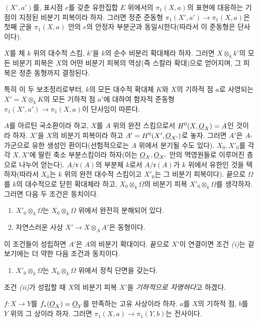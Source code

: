  $(X',a')$를, 표시점 $e$를 갖춘 유한집합 $E$
위에서의 $\pi_1(X,a)$의 표현에 대응하는 기점이 지정된 비분기 피복이라
하자. 그러면 정준 준동형
$\pi_1(X',a')\longrightarrow\pi_1(X,a)$은 첫째 군을 $\pi_1(X,a)$ 안의
$e$의 안정자 부분군과 동일시한다(따라서 이 준동형은 단사이다).

 $X$를 체 $k$ 위의 대수적 스킴, $k'$을 $k$의
순수 비분리 확대체라 하자. 그러면 $X\otimes_k k'$의 모든 비분기 피복은
$X$의 어떤 비분기 피복의 역상(즉 스칼라 확대)으로 얻어지며, 그 피복은
정준 동형까지 결정된다.

특히 이 두 보조정리로부터, $k$의 모든 대수적 확대체 $K$와
$X$의 기하적 점 $a$로 사영되는 $X'=X\otimes_k K$의 모든 기하적 점
$a'$에 대하여 함자적 준동형
$\pi_1(X',a')\longrightarrow\pi_1(X,a)$이 단사임이 따른다.

 $A$를 아르틴 국소환이라 하고, $X$를 $A$ 위의
완전 스킴으로서 $H^0(X,\underline{O}_X)=A$인 것이라 하자. $X'$을 $X$의 비분기
피복이라 하고 $A'=H^0(X',\underline{O}_{X'})$로 놓자. 그러면 $A'$은
$A$-가군으로 유한 생성인 환이다(선험적으로는 $A$ 위에서 분기될 수도
있다). $X_0,X'_0$를 각각 $X,X'$에 딸린 축소 부분스킴이라 하자(이는
$\underline{O}_X,\underline{O}_{X'}$ 안의 멱영원들로 이루어진 층으로 나누어 얻는다).
$A/\mathfrak r(A)$의 부분체 $k$로서 $A/\mathfrak r(A)$가 $k$ 위에서
유한인 것을 택하자(따라서 $X_0$는 $k$ 위의 완전 대수적 스킴이고
$X'_0$는 그 비분기 피복이다). 끝으로 $\Omega$를 $k$의 대수적으로 닫힌
확대체라 하고, $X_0\otimes_k\Omega$의 비분기 피복
$X'_0\otimes_k\Omega$를 생각하자. 그러면 다음 두 조건은 동치이다.
\begin{enumerate}
  \item[\textit{i.}] $X'_0\otimes_k\Omega$는
    $X_0\otimes_k\Omega$ 위에서 완전히 분해되어 있다.
  \item[\textit{ii.}] 자연스러운 사상
    $X'\longrightarrow X\otimes_A A'$은 동형이다.
\end{enumerate}
이 조건들이 성립하면 $A'$은 $A$의 비분기 확대이다. 끝으로 $X'$이
연결이면 조건 \textit{(i)}는 겉보기에는 더 약한 다음 조건과 동치이다.
\begin{enumerate}
  \item[\textit{i bis.}] $X'_0\otimes_k\Omega$는
    $X_0\otimes_k\Omega$ 위에서 정칙 단면을 갖는다.
\end{enumerate}
조건 \textit{(ii)}가 성립할 때 $X$의 비분기 피복 $X'$을
\emph{기하적으로 자명하다}고 하겠다.

 $f:X\longrightarrow Y$를
$f_*(\underline{O}_X)=\underline{O}_Y$를 만족하는 고유 사상이라 하자. $a$를 $X$의
기하적 점, $b$를 $Y$ 위의 그 상이라 하자. 그러면
$\pi_1(X,a)\longrightarrow\pi_1(Y,b)$는 전사이다.

